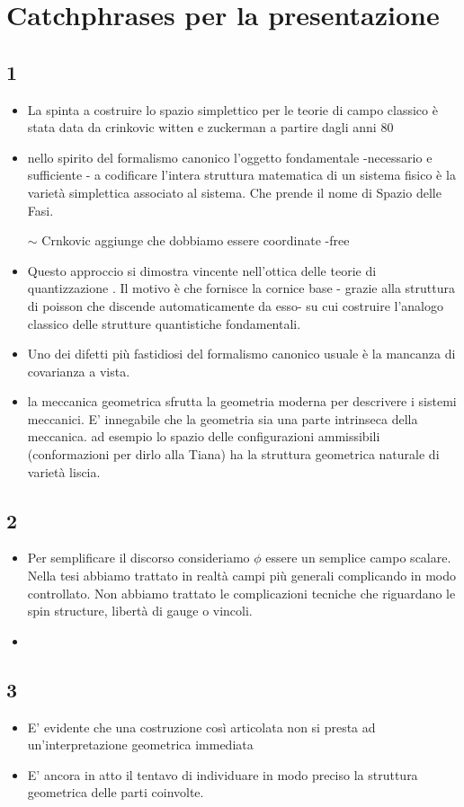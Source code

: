 \documentclass[Main]{subfiles}
\begin{document}
\chapter{Catchphrases per la presentazione}

	\section{1}
	\begin{itemize}
		\item La spinta a costruire lo spazio simplettico per le teorie di campo classico è stata data da crinkovic witten e zuckerman a partire dagli anni 80
		\item nello spirito del formalismo canonico l'oggetto fondamentale  -necessario e sufficiente - a codificare l'intera struttura matematica di un sistema fisico è la varietà simplettica associato al sistema. Che prende il nome di Spazio delle Fasi.
		\item[$\sim$]Crnkovic aggiunge che dobbiamo essere coordinate -free 
		\item Questo approccio si dimostra vincente nell'ottica delle teorie di quantizzazione . Il motivo è che fornisce la cornice base - grazie alla struttura di poisson che discende automaticamente da esso- su cui costruire l'analogo classico delle strutture quantistiche fondamentali.
		\item Uno dei difetti più fastidiosi del formalismo canonico usuale è la mancanza di covarianza a vista.
		\item la meccanica geometrica sfrutta la geometria moderna per descrivere i sistemi meccanici. E' innegabile che la geometria sia una parte intrinseca della meccanica. ad esempio lo spazio delle configurazioni ammissibili (conformazioni per dirlo alla Tiana) ha la struttura geometrica naturale di varietà liscia.
			 
		
	\end{itemize}		
	
	
	
	\section{2}
	\begin{itemize}
		\item Per semplificare il discorso consideriamo $\phi$ essere un semplice campo scalare. Nella tesi abbiamo trattato in realtà campi più generali complicando in modo controllato. Non abbiamo trattato le complicazioni tecniche che riguardano le spin structure, libertà di gauge o vincoli.
		\item
	\end{itemize}



	\section{3}
	\begin{itemize}
		\item E' evidente che una costruzione così articolata non si presta ad un'interpretazione geometrica immediata
		\item E' ancora in atto il tentavo di individuare in modo preciso la struttura geometrica delle parti coinvolte.
	\end{itemize}
\end{document}
